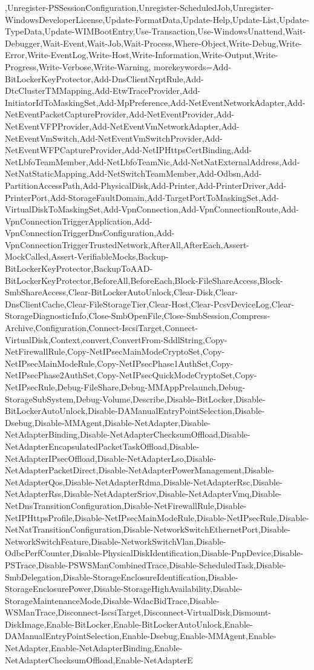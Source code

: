 {,Unregister-PSSessionConfiguration,Unregister-ScheduledJob,Unregister-WindowsDeveloperLicense,Update-FormatData,Update-Help,Update-List,Update-TypeData,Update-WIMBootEntry,Use-Transaction,Use-WindowsUnattend,Wait-Debugger,Wait-Event,Wait-Job,Wait-Process,Where-Object,Write-Debug,Write-Error,Write-EventLog,Write-Host,Write-Information,Write-Output,Write-Progress,Write-Verbose,Write-Warning},
  morekeywords={Add-BitLockerKeyProtector,Add-DnsClientNrptRule,Add-DtcClusterTMMapping,Add-EtwTraceProvider,Add-InitiatorIdToMaskingSet,Add-MpPreference,Add-NetEventNetworkAdapter,Add-NetEventPacketCaptureProvider,Add-NetEventProvider,Add-NetEventVFPProvider,Add-NetEventVmNetworkAdapter,Add-NetEventVmSwitch,Add-NetEventVmSwitchProvider,Add-NetEventWFPCaptureProvider,Add-NetIPHttpsCertBinding,Add-NetLbfoTeamMember,Add-NetLbfoTeamNic,Add-NetNatExternalAddress,Add-NetNatStaticMapping,Add-NetSwitchTeamMember,Add-Odbsn,Add-PartitionAccessPath,Add-PhysicalDisk,Add-Printer,Add-PrinterDriver,Add-PrinterPort,Add-StorageFaultDomain,Add-TargetPortToMaskingSet,Add-VirtualDiskToMaskingSet,Add-VpnConnection,Add-VpnConnectionRoute,Add-VpnConnectionTriggerApplication,Add-VpnConnectionTriggerDnsConfiguration,Add-VpnConnectionTriggerTrustedNetwork,AfterAll,AfterEach,Assert-MockCalled,Assert-VerifiableMocks,Backup-BitLockerKeyProtector,BackupToAAD-BitLockerKeyProtector,BeforeAll,BeforeEach,Block-FileShareAccess,Block-SmbShareAccess,Clear-BitLockerAutoUnlock,Clear-Disk,Clear-DnsClientCache,Clear-FileStorageTier,Clear-Host,Clear-PcsvDeviceLog,Clear-StorageDiagnosticInfo,Close-SmbOpenFile,Close-SmbSession,Compress-Archive,Configuration,Connect-IscsiTarget,Connect-VirtualDisk,Context,convert,ConvertFrom-SddlString,Copy-NetFirewallRule,Copy-NetIPsecMainModeCryptoSet,Copy-NetIPsecMainModeRule,Copy-NetIPsecPhase1AuthSet,Copy-NetIPsecPhase2AuthSet,Copy-NetIPsecQuickModeCryptoSet,Copy-NetIPsecRule,Debug-FileShare,Debug-MMAppPrelaunch,Debug-StorageSubSystem,Debug-Volume,Describe,Disable-BitLocker,Disable-BitLockerAutoUnlock,Disable-DAManualEntryPointSelection,Disable-Dsebug,Disable-MMAgent,Disable-NetAdapter,Disable-NetAdapterBinding,Disable-NetAdapterChecksumOffload,Disable-NetAdapterEncapsulatedPacketTaskOffload,Disable-NetAdapterIPsecOffload,Disable-NetAdapterLso,Disable-NetAdapterPacketDirect,Disable-NetAdapterPowerManagement,Disable-NetAdapterQos,Disable-NetAdapterRdma,Disable-NetAdapterRsc,Disable-NetAdapterRss,Disable-NetAdapterSriov,Disable-NetAdapterVmq,Disable-NetDnsTransitionConfiguration,Disable-NetFirewallRule,Disable-NetIPHttpsProfile,Disable-NetIPsecMainModeRule,Disable-NetIPsecRule,Disable-NetNatTransitionConfiguration,Disable-NetworkSwitchEthernetPort,Disable-NetworkSwitchFeature,Disable-NetworkSwitchVlan,Disable-OdbcPerfCounter,Disable-PhysicalDiskIdentification,Disable-PnpDevice,Disable-PSTrace,Disable-PSWSManCombinedTrace,Disable-ScheduledTask,Disable-SmbDelegation,Disable-StorageEnclosureIdentification,Disable-StorageEnclosurePower,Disable-StorageHighAvailability,Disable-StorageMaintenanceMode,Disable-WdacBidTrace,Disable-WSManTrace,Disconnect-IscsiTarget,Disconnect-VirtualDisk,Dismount-DiskImage,Enable-BitLocker,Enable-BitLockerAutoUnlock,Enable-DAManualEntryPointSelection,Enable-Dsebug,Enable-MMAgent,Enable-NetAdapter,Enable-NetAdapterBinding,Enable-NetAdapterChecksumOffload,Enable-NetAdapterE}
